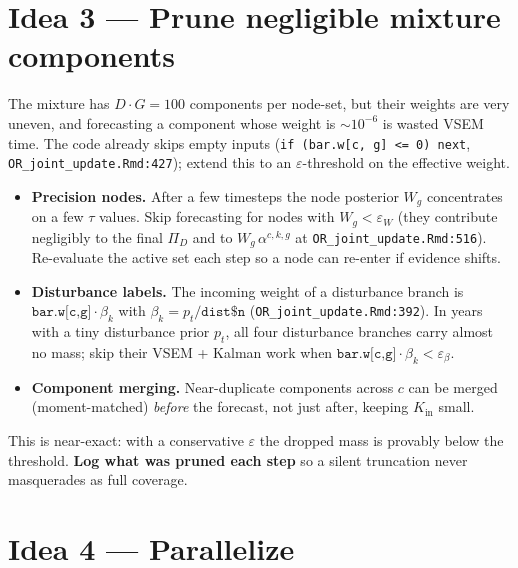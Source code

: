 \documentclass[11pt]{article}
\newcommand{\code}[1]{\texttt{#1}}
\begin{document}
\section{Idea 3 --- Prune negligible mixture components}
\label{sec:prune}

The mixture has $D\cdot G = 100$ components per node-set, but their weights are very
uneven, and forecasting a component whose weight is $\sim\!10^{-6}$ is wasted VSEM time.
The code already skips empty inputs (\code{if (bar.w[c, g] <= 0) next},
\code{OR\_joint\_update.Rmd:427}); extend this to an $\varepsilon$-threshold on the
effective weight.

\begin{itemize}[nosep]
  \item \textbf{Precision nodes.} After a few timesteps the node posterior $W_g$
        concentrates on a few $\tau$ values. Skip forecasting for nodes with
        $W_g < \varepsilon_W$ (they contribute negligibly to the final $\Pi_D$ and to
        $W_g\,\alpha^{c,k,g}$ at \code{OR\_joint\_update.Rmd:516}). Re-evaluate the
        active set each step so a node can re-enter if evidence shifts.
  \item \textbf{Disturbance labels.} The incoming weight of a disturbance branch is
        $\code{bar.w[c,g]}\cdot\beta_k$ with $\beta_k = p_t/\code{dist\$n}$
        (\code{OR\_joint\_update.Rmd:392}). In years with a tiny disturbance prior
        $p_t$, all four disturbance branches carry almost no mass; skip their VSEM +
        Kalman work when $\code{bar.w[c,g]}\cdot\beta_k < \varepsilon_\beta$.
  \item \textbf{Component merging.} Near-duplicate components across $c$ can be merged
        (moment-matched) \emph{before} the forecast, not just after, keeping
        $K_{\text{in}}$ small.
\end{itemize}
This is near-exact: with a conservative $\varepsilon$ the dropped mass is provably
below the threshold. \textbf{Log what was pruned each step} so a silent truncation never
masquerades as full coverage.

\section{Idea 4 --- Parallelize}
\label{sec:parallel}
\end{document}
